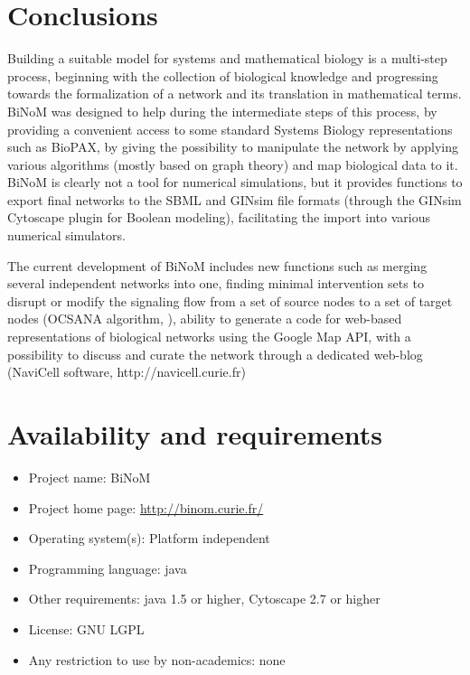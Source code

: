 \documentclass[10pt]{bmc_article}
\newenvironment{bmcformat}{\baselineskip20pt\sloppy\setboolean{publ}{false}}{\baselineskip20pt\sloppy}
\begin{document}
\begin{bmcformat}
\section*{Conclusions}

Building a suitable model for systems and mathematical biology is a multi-step
process, beginning with the collection of biological knowledge and progressing
towards the formalization of a network and its translation in mathematical
terms. BiNoM was designed to help during the intermediate steps of this process,
by providing a convenient access to some standard Systems Biology
representations such as BioPAX, by giving the possibility to manipulate the
network by applying various algorithms (mostly based on graph theory)
and map biological data to it. BiNoM is clearly not a tool for numerical
simulations, but it provides functions to export final networks to the SBML and
GINsim file formats (through the GINsim Cytoscape plugin for Boolean modeling), facilitating the
import into various numerical simulators.

The current development of BiNoM includes new functions such as merging several
independent networks into one, finding minimal intervention sets to disrupt or modify the
signaling flow from a set of source nodes to a set of target nodes (OCSANA algorithm, \cite{Vera-Licona2012OCSANA}), ability to
generate a code for web-based representations of biological networks using the
Google Map API, with a possibility to discuss and curate the network through a dedicated web-blog 
(NaviCell software, http://navicell.curie.fr)


\section*{Availability and requirements}

\begin{itemize}
\item Project name: BiNoM
\item Project home page: \url{http://binom.curie.fr/}
\item Operating system(s): Platform independent
\item Programming language: java
\item Other requirements: java 1.5 or higher, Cytoscape 2.7 or higher
\item License: GNU LGPL
\item Any restriction to use by non-academics: none
\end{itemize}





\end{bmcformat}
\end{document}
